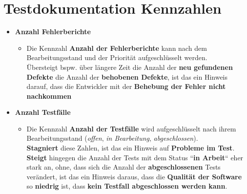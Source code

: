 \section{Testdokumentation Kennzahlen}


\begin{tcolorbox}[title=Kennzahlen der Tesdokumentation]

    \begin{itemize}
        \item \textbf{Anzahl Fehlerberichte}
        \begin{itemize}
            \item Die Kennzahl \textbf{Anzahl der Fehlerberichte} kann nach dem Bearbeitungsstand und der Priorität aufgeschlüsselt werden.\\
            Übersteigt bspw. über längere Zeit die Anzahl der \textbf{neu gefundenen Defekte} die Anzahl der \textbf{behobenen Defekte}, ist das ein Hinweis darauf, dass die Entwickler mit der \textbf{Behebung der Fehler nicht nachkommen}
        \end{itemize}
        \item \textbf{Anzahl Testfälle}
        \begin{itemize}
            \item Die Kennzahl \textbf{Anzahl der Testfälle} wird aufgeschlüsselt nach ihrem Bearbeitungsstand (\textit{offen}, \textit{in Bearbeitung}, \textit{abgeschlossen}).\\
            \textbf{Stagniert} diese Zahlen, ist das ein Hinweis auf \textbf{Probleme im Test}.\\
            \textbf{Steigt} hingegen die Anzahl der Tests mit dem Status ``\textbf{in Arbeit}`` eher stark an, ohne, dass sich die Anzahl der \textbf{abgeschlossenen} Tests verändert, ist das ein Hinweis daraus, dass die \textbf{Qualität der Software} so \textbf{niedrig} ist, dass \textbf{kein Testfall abgeschlossen werden kann}.
        \end{itemize}
    \end{itemize}

\end{tcolorbox}